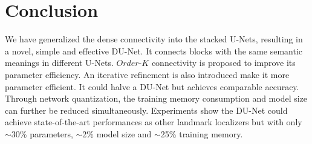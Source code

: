 \section{Conclusion}
We have generalized the dense connectivity into the stacked U-Nets, resulting in a novel, simple and effective DU-Net. It connects blocks with the same semantic meanings in different U-Nets. $Order$-$K$ connectivity is proposed to improve its parameter efficiency. An iterative refinement is also introduced make it more parameter efficient. It could halve a DU-Net but achieves comparable accuracy.
Through network quantization, the training memory consumption and model size can further be reduced simultaneously.
 Experiments show the DU-Net could achieve state-of-the-art performances as other landmark localizers but with only  $\sim$30\% parameters, $\sim$2\% model size and $\sim$25\% training memory.
